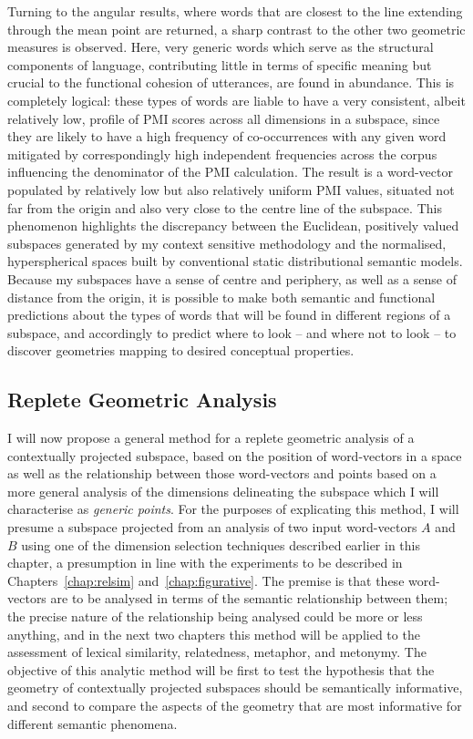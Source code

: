 Turning to the angular results, where words that are closest to the line extending through the mean point are returned, a sharp contrast to the other two geometric measures is observed.  Here, very generic words which serve as the structural components of language, contributing little in terms of specific meaning but crucial to the functional cohesion of utterances, are found in abundance.  This is completely logical: these types of words are liable to have a very consistent, albeit relatively low, profile of PMI scores across all dimensions in a subspace, since they are likely to have a high frequency of co-occurrences with any given word mitigated by correspondingly high independent frequencies across the corpus influencing the denominator of the PMI calculation.  The result is a word-vector populated by relatively low but also relatively uniform PMI values, situated not far from the origin and also very close to the centre line of the subspace.  This phenomenon highlights the discrepancy between the Euclidean, positively valued subspaces generated by my context sensitive methodology and the normalised, hyperspherical spaces built by conventional static distributional semantic models.  Because my subspaces have a sense of centre and periphery, as well as a sense of distance from the origin, it is possible to make both semantic and functional predictions about the types of words that will be found in different regions of a subspace, and accordingly to predict where to look -- and where not to look -- to discover geometries mapping to desired conceptual properties.

\subsection{Replete Geometric Analysis} \label{sec:replete}
I will now propose a general method for a replete geometric analysis of a contextually projected subspace, based on the position of word-vectors in a space as well as the relationship between those word-vectors and points based on a more general analysis of the dimensions delineating the subspace which I will characterise as \emph{generic points}.  For the purposes of explicating this method, I will presume a subspace projected from an analysis of two input word-vectors $A$ and $B$ using one of the dimension selection techniques described earlier in this chapter, a presumption in line with the experiments to be described in Chapters~\ref{chap:relsim} and~\ref{chap:figurative}.  The premise is that these word-vectors are to be analysed in terms of the semantic relationship between them; the precise nature of the relationship being analysed could be more or less anything, and in the next two chapters this method will be applied to the assessment of lexical similarity, relatedness, metaphor, and metonymy.  The objective of this analytic method will be first to test the hypothesis that the geometry of contextually projected subspaces should be semantically informative, and second to compare the aspects of the geometry that are most informative for different semantic phenomena.


